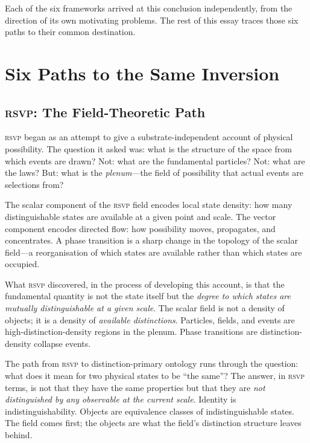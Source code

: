 \documentclass[12pt, letterpaper]{article}
\theoremstyle{remark}
\newcommand{\rsvp}{\textsc{rsvp}}
\begin{document}
Each of the six frameworks arrived at this conclusion independently, from
the direction of its own motivating problems.  The rest of this essay traces
those six paths to their common destination.

\section{Six Paths to the Same Inversion}

\subsection{\rsvp{}: The Field-Theoretic Path}

\rsvp{} began as an attempt to give a substrate-independent account of
physical possibility.  The question it asked was: what is the structure of
the space from which events are drawn?  Not: what are the fundamental
particles?  Not: what are the laws?  But: what is the \emph{plenum}---the
field of possibility that actual events are selections from?

The scalar component of the \rsvp{} field encodes local state density:
how many distinguishable states are available at a given point and scale.
The vector component encodes directed flow: how possibility moves, propagates,
and concentrates.  A phase transition is a sharp change in the topology of
the scalar field---a reorganisation of which states are available rather
than which states are occupied.

What \rsvp{} discovered, in the process of developing this account, is that
the fundamental quantity is not the state itself but the \emph{degree to
which states are mutually distinguishable at a given scale}.  The scalar
field is not a density of objects; it is a density of \emph{available
distinctions}.  Particles, fields, and events are high-distinction-density
regions in the plenum.  Phase transitions are distinction-density collapse
events.

The path from \rsvp{} to distinction-primary ontology runs through the
question: what does it mean for two physical states to be ``the same''?
The answer, in \rsvp{} terms, is not that they have the same properties but
that they are \emph{not distinguished by any observable at the current scale}.
Identity is indistinguishability.  Objects are equivalence classes of
indistinguishable states.  The field comes first; the objects are what
the field's distinction structure leaves behind.
\end{document}
